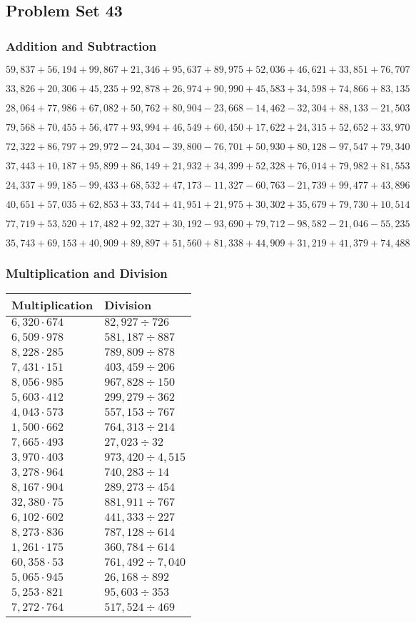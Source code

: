\hypertarget{problem-set-43-3}{%
\subsection{Problem Set 43}\label{problem-set-43-3}}

\hypertarget{addition-and-subtraction-265}{%
\subsubsection{Addition and
Subtraction}\label{addition-and-subtraction-265}}

\(59,837+56,194+99,867+21,346+95,637+89,975+52,036+46,621+33,851+ 76,707\)

\(33,826+20,306+45,235+92,878+26,974+90,990+45,583+34,598+74,866+83,135\)

\(28,064+77,986+67,082+50,762+80,904-23,668-14,462-32,304+88,133-21,503\)

\(79,568+70,455+56,477+93,994+46,549+60,450+17,622+24,315+52,652+33,970\)

\(72,322+86,797+29,972-24,304-39,800-76,701+50,930+80,128-97,547+79,340\)

\(37,443+10,187+95,899+86,149+21,932+34,399+52,328+76,014+79,982+81,553\)

\(24,337+99,185-99,433+68,532+47,173-11,327-60,763-21,739+99,477+43,896\)

\(40,651+57,035+62,853+33,744+41,951+21,975+30,302+35,679+79,730+10,514\)

\(77,719+53,520+17,482+92,327+30,192-93,690+79,712-98,582-21,046-55,235\)

\(35,743+69,153+40,909+89,897+51,560+81,338+44,909+31,219+41,379+74,488\)

\hypertarget{multiplication-and-division-264}{%
\subsubsection{Multiplication and
Division}\label{multiplication-and-division-264}}

\begin{longtable}[]{@{}ll@{}}
\toprule
Multiplication & Division\tabularnewline
\midrule
\endhead
\(6,320\cdot674\) & \(82,927÷726\)\tabularnewline
\(6,509\cdot978\) & \(581,187÷887\)\tabularnewline
\(8,228\cdot285\) & \(789,809÷878\)\tabularnewline
\(7,431\cdot151\) & \(403,459÷206\)\tabularnewline
\(8,056\cdot985\) & \(967,828÷150\)\tabularnewline
\(5,603\cdot412\) & \(299,279÷362\)\tabularnewline
\(4,043\cdot573\) & \(557,153÷767\)\tabularnewline
\(1,500\cdot662\) & \(764,313÷214\)\tabularnewline
\(7,665\cdot493\) & \(27,023÷32\)\tabularnewline
\(3,970\cdot403\) & \(973,420÷4,515\)\tabularnewline
\(3,278\cdot964\) & \(740,283÷14\)\tabularnewline
\(8,167\cdot904\) & \(289,273÷454\)\tabularnewline
\(32,380\cdot75\) & \(881,911÷767\)\tabularnewline
\(6,102\cdot602\) & \(441,333÷227\)\tabularnewline
\(8,273\cdot836\) & \(787,128÷614\)\tabularnewline
\(1,261\cdot175\) & \(360,784÷614\)\tabularnewline
\(60,358\cdot53\) & \(761,492÷7,040\)\tabularnewline
\(5,065\cdot945\) & \(26,168÷892\)\tabularnewline
\(5,253\cdot821\) & \(95,603÷353\)\tabularnewline
\(7,272\cdot764\) & \(517,524÷469\)\tabularnewline
\bottomrule
\end{longtable}

